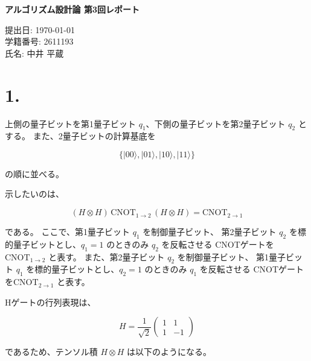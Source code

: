 \documentclass[11pt,a4paper]{ltjsarticle}
\begin{document}
\begin{center}
{\LARGE \textbf{アルゴリズム設計論 第3回レポート}}
\end{center}
\vspace{1em}

\begin{flushright}
提出日: \today \\
学籍番号: 2611193 \\
氏名: 中井 平蔵
\end{flushright}

\section*{1.}
上側の量子ビットを第1量子ビット $q_1$、下側の量子ビットを第2量子ビット $q_2$ とする。
また、2量子ビットの計算基底を

\[
\{\lvert 00 \rangle, \lvert 01 \rangle, \lvert 10 \rangle, \lvert 11 \rangle\}
\]

の順に並べる。

示したいのは、

\[
(H \otimes H)\,\mathrm{CNOT}_{1 \to 2}\,(H \otimes H) = \mathrm{CNOT}_{2 \to 1}
\]

である。
ここで、第1量子ビット $q_1$ を制御量子ビット、
第2量子ビット $q_2$ を標的量子ビットとし、$q_1 = 1$ のときのみ $q_2$ を反転させる
CNOTゲートを$\mathrm{CNOT}_{1 \to 2}$ と表す。
また、第2量子ビット $q_2$ を制御量子ビット、
第1量子ビット $q_1$ を標的量子ビットとし、$q_2 = 1$ のときのみ $q_1$ を反転させる
CNOTゲートを$\mathrm{CNOT}_{2 \to 1}$ と表す。

Hゲートの行列表現は、

\[
H = \frac{1}{\sqrt{2}}
\begin{pmatrix}
1 & 1 \\
1 & -1
\end{pmatrix}
\]

であるため、テンソル積 $H \otimes H$ は以下のようになる。
\end{document}
